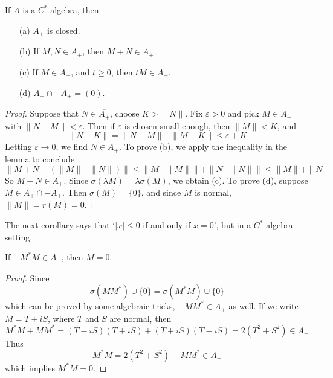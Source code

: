 \begin{prop}
    If $A$ is a $C^*$ algebra, then
    \begin{enumerate}
        \item[(a)] $A_+$ is closed.
        \item[(b)] If $M,N \in A_+$, then $M + N \in A_+$.
        \item[(c)] If $M \in A_+$, and $t \geq 0$, then $tM \in A_+$.
        \item[(d)] $A_+ \cap -A_+ = (0)$.
    \end{enumerate}
\end{prop}
\begin{proof}
    Suppose that $N \in \overline{A_+}$, choose $K > \| N \|$. Fix $\varepsilon > 0$ and pick $M \in A_+$ with $\| N - M \| < \varepsilon$. Then if $\varepsilon$ is chosen small enough, then $\| M \| < K$, and
    \[ \| N - K \| = \| N - M \| + \| M - K \| \leq \varepsilon + K \]
    Letting $\varepsilon \to 0$, we find $N \in A_+$. To prove (b), we apply the inequality in the lemma to conclude
    \[ \| M + N - (\| M \| + \| N \| ) \| \leq \| M - \| M \| \| + \| N - \| N \| \| \leq \| M \| + \| N \| \]
    So $M + N \in A_+$. Since $\sigma(\lambda M) = \lambda \sigma(M)$, we obtain (c). To prove (d), suppose $M \in A_+ \cap -A_+$. Then $\sigma(M) = \{ 0 \}$, and since $M$ is normal, $\| M \| = r(M) = 0$.
\end{proof}

The next corollary says that `$| x | \leq 0$ if and only if $x = 0$', but in a $C^*$-algebra setting.

\begin{lemma}
    If $-M^*M \in A_+$, then $M = 0$.
\end{lemma}
\begin{proof}
    Since
    \[ \sigma(MM^*) \cup \{ 0 \} = \sigma(M^*M) \cup \{ 0 \} \]
    which can be proved by some algebraic tricks, $-MM^* \in A_+$ as well. If we write $M = T + iS$, where $T$ and $S$ are normal, then
    \[ M^*M + MM^* = (T - iS)(T + iS) + (T + iS)(T - iS) = 2(T^2 + S^2) \in A_+ \]
    Thus
    \[ M^*M = 2(T^2 + S^2) - MM^* \in A_+ \]
    which implies $M^*M = 0$.
\end{proof}

